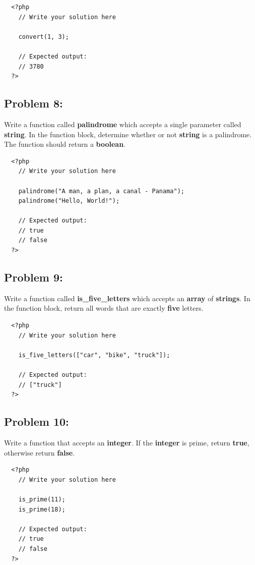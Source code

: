 \documentclass{article}
\begin{document}
\begin{verbatim}
  <?php  
    // Write your solution here

    convert(1, 3);

    // Expected output:
    // 3780
  ?>
\end{verbatim}

\subsection*{Problem 8:}
Write a function called \textbf{palindrome} which accepts a single parameter called \textbf{string}. In the function block, determine whether or not \textbf{string} is a palindrome. The function should return a \textbf{boolean}.

\begin{verbatim}
  <?php  
    // Write your solution here

    palindrome("A man, a plan, a canal - Panama");
    palindrome("Hello, World!");

    // Expected output:
    // true
    // false
  ?>
\end{verbatim}
 
\subsection*{Problem 9:}
Write a function called \textbf{is\_five\_letters} which accepts an \textbf{array} of \textbf{strings}. In the function block, return all words that are exactly \textbf{five} letters.

\begin{verbatim}
  <?php  
    // Write your solution here

    is_five_letters(["car", "bike", "truck"]);

    // Expected output:
    // ["truck"] 
  ?>
\end{verbatim}

\subsection*{Problem 10:}
Write a function that accepts an \textbf{integer}. If the \textbf{integer} is prime, return \textbf{true}, otherwise return \textbf{false}. 

\begin{verbatim}
  <?php  
    // Write your solution here

    is_prime(11);
    is_prime(18);

    // Expected output:
    // true
    // false
  ?>
\end{verbatim}
\end{document}
